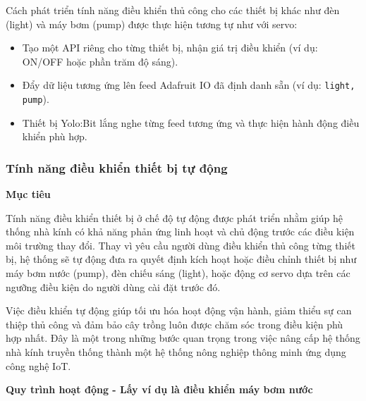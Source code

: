 Cách phát triển tính năng điều khiển thủ công cho các thiết bị khác như đèn (light) và máy bơm (pump) được thực hiện tương tự như với servo:
\begin{itemize}
    \item Tạo một API riêng cho từng thiết bị, nhận giá trị điều khiển (ví dụ: ON/OFF hoặc phần trăm độ sáng).
    \item Đẩy dữ liệu tương ứng lên feed Adafruit IO đã định danh sẵn (ví dụ: \texttt{light, pump}).
    \item Thiết bị Yolo:Bit lắng nghe từng feed tương ứng và thực hiện hành động điều khiển phù hợp.
\end{itemize}

\subsubsection{Tính năng điều khiển thiết bị tự động}

\textbf{Mục tiêu}

Tính năng điều khiển thiết bị ở chế độ tự động được phát triển nhằm giúp hệ thống nhà kính có khả năng phản ứng linh hoạt và chủ động trước các điều kiện môi trường thay đổi. Thay vì yêu cầu người dùng điều khiển thủ công từng thiết bị, hệ thống sẽ tự động đưa ra quyết định kích hoạt hoặc điều chỉnh thiết bị như máy bơm nước (pump), đèn chiếu sáng (light), hoặc động cơ servo dựa trên các ngưỡng điều kiện do người dùng cài đặt trước đó.

Việc điều khiển tự động giúp tối ưu hóa hoạt động vận hành, giảm thiểu sự can thiệp thủ công và đảm bảo cây trồng luôn được chăm sóc trong điều kiện phù hợp nhất. Đây là một trong những bước quan trọng trong việc nâng cấp hệ thống nhà kính truyền thống thành một hệ thống nông nghiệp thông minh ứng dụng công nghệ IoT.

\textbf{Quy trình hoạt động - Lấy ví dụ là điều khiển máy bơm nước}

